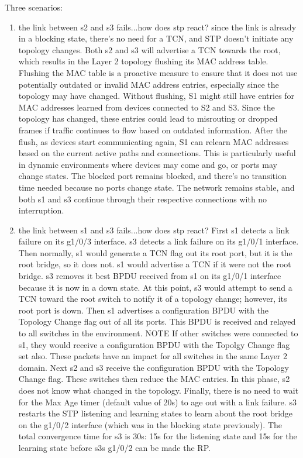 \documentclass{article}
\begin{document}
\noindent Three scenarios:
\begin{enumerate}[label = \arabic*.]
\item the link between s2 and s3 fails...how does stp react? since the link is already in a blocking state, there's no need for a TCN, and STP doesn't initiate any topology changes. Both s2 and s3 will advertise a TCN towards the root, which results in the Layer 2 topology flushing its MAC address table. Flushing the MAC table is a proactive measure to ensure that it does not use potentially outdated or invalid MAC address entries, especially since the topology may have changed. Without flushing, S1 might still have entries for MAC addresses learned from devices connected to S2 and S3. Since the topology has changed, these entries could lead to misrouting or dropped frames if traffic continues to flow based on outdated information. After the flush, as devices start communicating again, S1 can relearn MAC addresses based on the current active paths and connections. This is particularly useful in dynamic environments where devices may come and go, or ports may change states. The blocked port remains blocked, and there's no transition time needed because no ports change state. The network remains stable, and both s1 and s3 continue through their respective connections with no interruption.
\item the link between s1 and s3 fails...how does stp react? First s1 detects a link failure on its g1/0/3 interface. s3 detects a link failure on its g1/0/1 interface. Then normally, s1 would generate a TCN flag out its root port, but it is the root bridge, so it does not. s1 would advertise a TCN if it were not the root bridge. s3 removes it best BPDU received from s1 on its g1/0/1 interface because it is now in a down state. At this point, s3 would attempt to send a TCN toward the root switch to notify it of a topology change; however, its root port is down. Then s1 advertises a configuration BPDU with the Topology Change flag out of all its ports. This BPDU is received and relayed to all switches in the environment. NOTE If other switches were connected to s1, they would receive a configuration BPDU with the Topolgy Change flag set also. These packets have an impact for all switches in the same Layer 2 domain. Next s2 and s3 receive the configuration BPDU with the Topology Change flag. These switches then reduce the MAC entries. In this phase, s2 does not know what changed in the topology. Finally, there is no need to wait for the Max Age timer (default value of 20s) to age out with a link failure. s3 restarts the STP listening and learning states to learn about the root bridge on the g1/0/2 interface (which was in the blocking state previously). The total convergence time for s3 is 30s: 15s for the listening state and 15s for the learning state before s3s g1/0/2 can be made the RP.

\end{enumerate}
\end{document}
